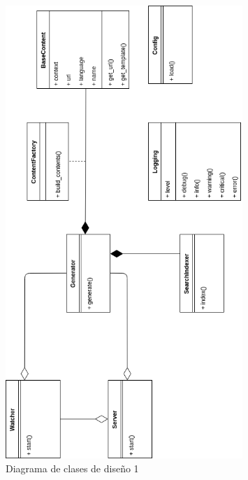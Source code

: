 \begin{figure}[htbp]
    \centering
    \includegraphics[width=0.8\textwidth]{5_diseno/clases_de_diseno1}
    \caption{Diagrama de clases de diseño 1}
    \label{fig:clases_diseno}
\end{figure}

